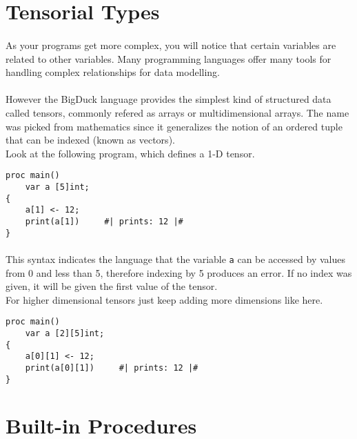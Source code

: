 \newpage

\section{Tensorial Types}

\paragraph{} As your programs get more complex, you will notice that certain
variables are related to other variables. Many programming languages offer
many tools for handling complex relationships for data modelling.

\paragraph{} However the BigDuck language provides the simplest kind of
structured data called tensors, commonly refered as arrays or multidimensional
arrays. The name was picked from mathematics since it generalizes the notion of
an ordered tuple that can be indexed (known as vectors).\\

\noindent
Look at the following program, which defines a 1-D tensor.

\begin{verbatim}
proc main()
    var a [5]int;
{
    a[1] <- 12;
    print(a[1])     #| prints: 12 |#
}
\end{verbatim}

\paragraph{} This syntax indicates the language that the variable \texttt{a}
can be accessed by values from 0 and less than 5, therefore indexing by 5
produces an error. If no index was given, it will be given the first value of
the tensor.\\

\noindent
For higher dimensional tensors just keep adding more dimensions like here.

\begin{verbatim}
proc main()
    var a [2][5]int;
{
    a[0][1] <- 12;
    print(a[0][1])     #| prints: 12 |#
}
\end{verbatim}

\newpage

\section{Built-in Procedures}
